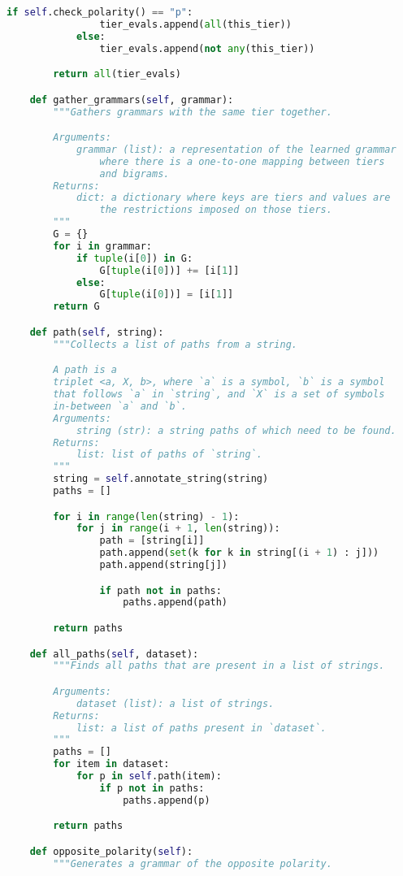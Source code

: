 \begin{lstlisting}[language=Python]
            if self.check_polarity() == "p":
                tier_evals.append(all(this_tier))
            else:
                tier_evals.append(not any(this_tier))

        return all(tier_evals)

    def gather_grammars(self, grammar):
        """Gathers grammars with the same tier together.

        Arguments:
            grammar (list): a representation of the learned grammar
                where there is a one-to-one mapping between tiers
                and bigrams.
        Returns:
            dict: a dictionary where keys are tiers and values are
                the restrictions imposed on those tiers.
        """
        G = {}
        for i in grammar:
            if tuple(i[0]) in G:
                G[tuple(i[0])] += [i[1]]
            else:
                G[tuple(i[0])] = [i[1]]
        return G

    def path(self, string):
        """Collects a list of paths from a string.

        A path is a
        triplet <a, X, b>, where `a` is a symbol, `b` is a symbol
        that follows `a` in `string`, and `X` is a set of symbols
        in-between `a` and `b`.
        Arguments:
            string (str): a string paths of which need to be found.
        Returns:
            list: list of paths of `string`.
        """
        string = self.annotate_string(string)
        paths = []

        for i in range(len(string) - 1):
            for j in range(i + 1, len(string)):
                path = [string[i]]
                path.append(set(k for k in string[(i + 1) : j]))
                path.append(string[j])

                if path not in paths:
                    paths.append(path)

        return paths

    def all_paths(self, dataset):
        """Finds all paths that are present in a list of strings.

        Arguments:
            dataset (list): a list of strings.
        Returns:
            list: a list of paths present in `dataset`.
        """
        paths = []
        for item in dataset:
            for p in self.path(item):
                if p not in paths:
                    paths.append(p)

        return paths

    def opposite_polarity(self):
        """Generates a grammar of the opposite polarity.


\end{lstlisting}
